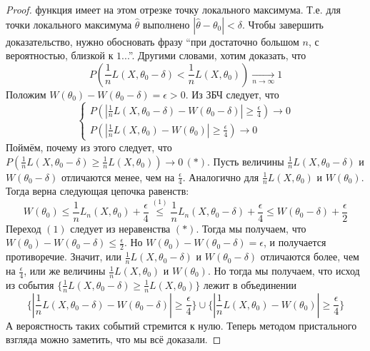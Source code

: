 \begin{proof}
    функция имеет на этом отрезке точку локального максимума. Т.е. для точки локального максимума $\hat{\theta}$ выполнено $|\hat{\theta} - \theta_0| < \delta$.
    Чтобы завершить доказательство, нужно обосновать фразу ``при достаточно большом $n$, с вероятностью, близкой к $1$...''.
    Другими словами, хотим доказать, что
    \[
        P\left( \frac{1}{n} L(X, \theta_0 - \delta) < \frac{1}{n} L(X, \theta_0) \right) \xrightarrow[n \to \infty]{} 1
    \]
    Положим $W(\theta_0) - W(\theta_0 - \delta) = \epsilon > 0$. Из ЗБЧ следует, что
    \[
        \begin{cases}
            P\left(\left| \frac{1}{n} L(X, \theta_0 - \delta) - W(\theta_0 - \delta) \right| \geq \frac{\epsilon}{4} \right) \to 0\\
            P\left( \left| \frac{1}{n} L(X, \theta_0) - W(\theta_0) \right| \geq \frac{\epsilon}{4} \right) \to 0
        \end{cases}
    \]
    Поймём, почему из этого следует, что $P\left(\frac{1}{n} L(X, \theta_0 - \delta) \geq  \frac{1}{n} L(X, \theta_0)\right) \to 0 \, (*)$.
    Пусть величины $\frac{1}{n} L(X, \theta_0 - \delta)$ и $W(\theta_0 - \delta)$ отличаются менее, чем на $\frac{\epsilon}{4}$. Аналогично для
    $\frac{1}{n} L(X, \theta_0)$ и $W(\theta_0)$. Тогда верна следующая цепочка равенств:
    \[
        W(\theta_0) \leq \frac{1}{n}L_n(X, \theta_0) + \frac{\epsilon}{4} \overset{(1)}{\leq} \frac{1}{n}L_n(X, \theta_0 - \delta) + \frac{\epsilon}{4}
        \leq W(\theta_0 - \delta) + \frac{\epsilon}{2}
    \]
    Переход $(1)$ следует из неравенства $(*)$. Тогда мы получаем, что $W(\theta_0) - W(\theta_0 - \delta) \leq \frac{\epsilon}{2}$. Но
    $W(\theta_0) - W(\theta_0 - \delta) = \epsilon$, и получается противоречие. Значит, или
    $\frac{1}{n} L(X, \theta_0 - \delta)$ и $W(\theta_0 - \delta)$ отличаются более, чем на $\frac{\epsilon}{4}$, или же величины
    $\frac{1}{n} L(X, \theta_0)$ и $W(\theta_0)$. Но тогда мы получаем, что исход из события
    $\{\frac{1}{n} L(X, \theta_0 - \delta) \geq  \frac{1}{n} L(X, \theta_0)\}$ лежит в объединении
    \[
        \{\left| \frac{1}{n} L(X, \theta_0 - \delta) - W(\theta_0 - \delta) \right| \geq \frac{\epsilon}{4}\}
        \cup
        \{\left| \frac{1}{n} L(X, \theta_0) - W(\theta_0) \right| \geq \frac{\epsilon}{4}\}
    \]
    А вероястность таких событий стремится к нулю. Теперь методом пристального взгляда можно заметить, что мы всё доказали.
\end{proof}